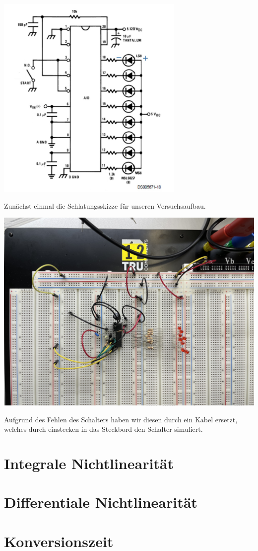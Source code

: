 \begin{center}
	\includegraphics[height=10cm]{images/Schaltungsskizze-versuch-eins.jpg} 
\end{center}
Zunächst einmal die Schlatungsskizze für unseren Versuchsaufbau.
\begin{center}
	\includegraphics[height=10cm]{images/Schaltungsaufbau-versuch-eins.jpeg}
\end{center}
Aufgrund des Fehlen des Schalters haben wir diesen durch ein Kabel ersetzt, welches 
durch einstecken in das Steckbord den Schalter simuliert.

\section{Integrale Nichtlinearität}
\section{Differentiale Nichtlinearität}
\section{Konversionszeit}
